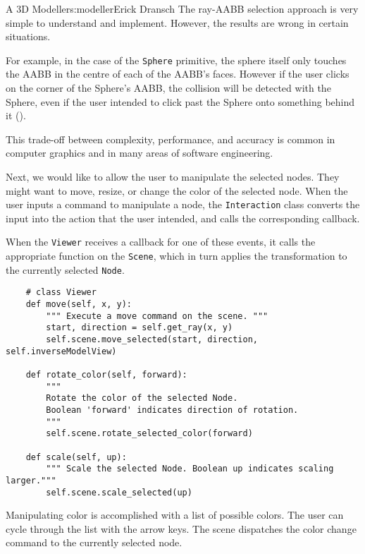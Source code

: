 \begin{aosachapter}{A 3D Modeller}{s:modeller}{Erick Dransch}
The ray-AABB selection approach is very simple to understand and
implement. However, the results are wrong in certain situations.


For example, in the case of the \texttt{Sphere} primitive, the sphere
itself only touches the AABB in the centre of each of the AABB's faces.
However if the user clicks on the corner of the Sphere's AABB, the
collision will be detected with the Sphere, even if the user intended to
click past the Sphere onto something behind it
().

This trade-off between complexity, performance, and accuracy is common
in computer graphics and in many areas of software engineering.

\label{modifying-scene-objects}

Next, we would like to allow the user to manipulate the selected nodes.
They might want to move, resize, or change the color of the selected
node. When the user inputs a command to manipulate a node, the
\texttt{Interaction} class converts the input into the action that the
user intended, and calls the corresponding callback.

When the \texttt{Viewer} receives a callback for one of these events, it
calls the appropriate function on the \texttt{Scene}, which in turn
applies the transformation to the currently selected \texttt{Node}.

\begin{verbatim}
    # class Viewer
    def move(self, x, y):
        """ Execute a move command on the scene. """
        start, direction = self.get_ray(x, y)
        self.scene.move_selected(start, direction, self.inverseModelView)
    
    def rotate_color(self, forward):
        """ 
        Rotate the color of the selected Node. 
        Boolean 'forward' indicates direction of rotation. 
        """
        self.scene.rotate_selected_color(forward)
    
    def scale(self, up):
        """ Scale the selected Node. Boolean up indicates scaling larger."""
        self.scene.scale_selected(up)
\end{verbatim}

\label{changing-color}

Manipulating color is accomplished with a list of possible colors. The
user can cycle through the list with the arrow keys. The scene
dispatches the color change command to the currently selected node.


\end{aosachapter}

